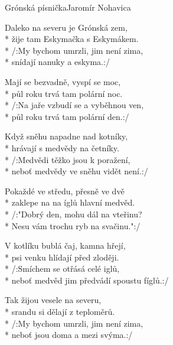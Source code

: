 \documentclass[10.5pt]{book}
\begin{document}
\begin{poem}{Grónská písnička}{Jaromír Nohavica}

\settowidth{\versewidth}{neboť medvěd jim předvádí spoustu fíglů.}

Daleko na severu je Grónská zem,\\*
žije tam Eskymačka s Eskymákem.\\*
/:My bychom umrzli, jim není zima,\\*
snídají nanuky a eskyma.:/

Mají se bezvadně, vyspí se moc,\\*
půl roku trvá tam polární noc.\\*
/:Na jaře vzbudí se a vyběhnou ven,\\*
půl roku trvá tam polární den.:/

Když sněhu napadne nad kotníky,\\*
hrávají s medvědy na četníky.\\*
/:Medvědi těžko jsou k poražení,\\*
neboť medvědy ve sněhu vidět není.:/

Pokaždé ve středu, přesně ve dvě\\*
zaklepe na na íglů hlavní medvěd.\\*
/:"Dobrý den, mohu dál na vteřinu?\\*
Nesu vám trochu ryb na svačinu.":/

V kotlíku bublá čaj, kamna hřejí,\\*
psi venku hlídají před zloději.\\*
/:Smíchem se otřásá celé iglů,\\*
neboť medvěd jim předvádí spoustu fíglů.:/

Tak žijou vesele na severu,\\*
srandu si dělají z teploměrů.\\*
/:My bychom umrzli, jim není zima,\\*
neboť jsou doma a mezi svýma.:/
\end{poem}
\end{document}
